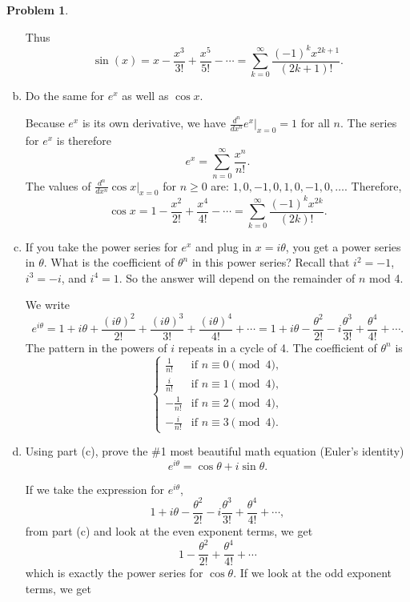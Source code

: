 \documentclass[11pt,oneside]{amsart}
\theoremstyle{definition}
\newtheorem{problem}{Problem}
\theoremstyle{plain}
\begin{document}
\begin{problem}
\begin{enumerate}[(a)]
\begin{solution}
          Thus
          \[\sin(x)=x-\frac{x^3}{3!}+\frac{x^5}{5!}-\cdots=\sum_{k=0}^\infty\frac{(-1)^k x^{2k+1}}{(2k+1)!}.\]
        \end{solution}
  \item Do the same for $e^x$ as well as $\cos x$.
        \begin{solution}
          Because $e^x$ is its own derivative, we have $\frac{d^n}{dx^n}e^x\Big|_{x=0}=1$ for all $n$. The series for $e^x$ is therefore
          \[e^x=\sum_{n=0}^\infty \frac {x^n}{n!}.\]
          The values of $\frac{d^n}{dx^n}\cos x\Big|_{x=0}$ for $n\geq 0$ are: $1,0,-1,0,1,0,-1,0,\dots$. Therefore,
          \[\cos x=1-\frac{x^2}{2!}+\frac{x^4}{4!}-\cdots=\sum_{k=0}^\infty\frac{(-1)^kx^{2k}}{(2k)!}.\]
        \end{solution}
  \item If you take the power series for $e^x$ and plug in $x=i\theta$, you get a power series in $\theta$. What is the coefficient of $\theta^n$ in this power series? Recall that $i^2=-1$, $i^3=-i$, and $i^4=1$. So the answer will depend on the remainder of $n$ mod 4.
        \begin{solution}
          We write
          \[e^{i\theta}=1+i\theta+\frac{(i\theta)^2}{2!}+\frac{(i\theta)^3}{3!}+\frac{(i\theta)^4}{4!}+\cdots=1+i\theta-\frac{\theta^2}{2!}-i\frac{\theta^3}{3!}+\frac{\theta^4}{4!}+\cdots.\]
          The pattern in the powers of $i$ repeats in a cycle of 4. The coefficient of $\theta^n$ is
          \[\begin{cases}
              \frac 1{n!}  & \text{if }n\equiv 0\pmod 4, \\
              \frac i{n!}  & \text{if }n\equiv 1\pmod 4, \\
              -\frac 1{n!} & \text{if }n\equiv 2\pmod 4, \\
              -\frac i{n!} & \text{if }n\equiv 3\pmod 4.
            \end{cases}\]
        \end{solution}
  \item Using part (c), prove the \#1 most beautiful math equation (Euler's identity)
        \[e^{i\theta}=\cos\theta+i\sin\theta.\]
        \begin{solution}
          If we take the expression for $e^{i\theta}$,
          \[1+i\theta-\frac{\theta^2}{2!}-i\frac{\theta^3}{3!}+\frac{\theta^4}{4!}+\cdots,\]
          from part (c) and look at the even exponent terms, we get
          \[1-\frac{\theta^2}{2!}+\frac{\theta^4}{4!}+\cdots\]
          which is exactly the power series for $\cos\theta$. If we look at the odd exponent terms, we get

\end{solution}
\end{enumerate}
\end{problem}
\end{document}
